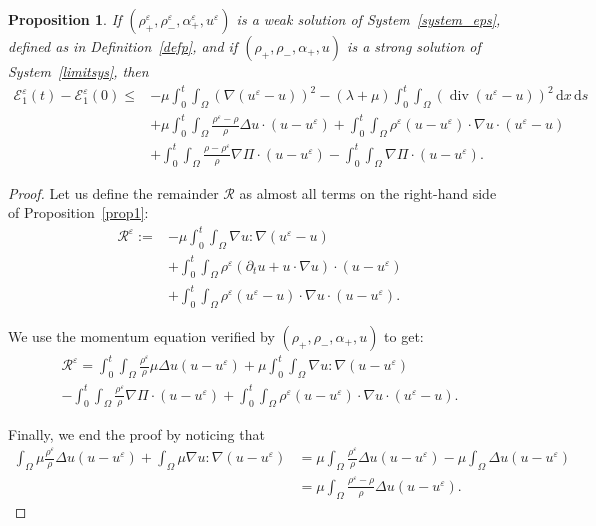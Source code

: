 \documentclass[11pt, twoside, a4paper]{article}
\theoremstyle{plain}
\newtheorem{proposition}[theorem]{Proposition}
\theoremstyle{remark}
\numberwithin{equation}{section}
\def\EE{{\mathcal E}}
\def\RR{{\mathcal R}}
\newcommand{\dd}{\,\mathrm{d}}
\renewcommand{\div}{\operatorname{div}}
\renewcommand{\leq}{\leqslant}\renewcommand{\le}{\leqslant}
\renewcommand{\epsilon}{\varepsilon}
\newcommand{\eps}{\varepsilon}
\begin{document}
\begin{proposition}\label{prop2}
If $(\rho^{\epsilon}_+,\rho^{\epsilon}_-,\alpha^{\epsilon}_+,u^{\epsilon})$ is a weak solution of System~\eqref{system_eps}, defined as in Definition~\ref{defp}, and if $(\rho_+,\rho_-,\alpha_+,u)$ is a strong solution of System~\eqref{limitsys}, then
\begin{align*}
\EE_1^\eps(t) - \EE_1^\eps(0) \leq& - \mu \int_0^t\!\!\! \int_{\Omega} \left( \nabla (u^{\epsilon}-u) \right)^2 - (\lambda+\mu) \int_0^t\!\!\! \int_{\Omega} \left( \div (u^{\epsilon}-u) \right)^2 \dd x \dd s \\
 &+ \mu \int_0^t\!\!\! \int_\Omega \frac{\rho^\eps - \rho}{\rho} \Delta u \cdot(u-u^\eps) 
 + \int_0^t\!\!\! \int_{\Omega} \rho^\eps (u-u^\eps) \cdot \nabla u \cdot (u^\eps-u) \\
 &+ \int_0^t\!\!\! \int_{\Omega} \frac{\rho-\rho^\eps}{\rho} \nabla \Pi\cdot (u-u^\eps)- \int_0^t\!\!\! \int_{\Omega} \nabla \Pi\cdot (u-u^\eps). 
\end{align*}
\end{proposition}

\begin{proof}
Let us define the remainder $\RR$ as almost all terms on the right-hand side of Proposition~\ref{prop1}:
 \begin{align*}
 \RR^\eps := &-\mu \int_0^t\!\!\! \int_{\Omega} \nabla u : \nabla(u^\eps-u) \\
 &+ \int_0^t\!\!\! \int_{\Omega} \rho^\eps (\partial_t u + u \cdot \nabla u)\cdot (u-u^{\epsilon}) \\
 &+ \int_0^t\!\!\! \int_{\Omega} \rho^\eps (u^{\epsilon}-u)\cdot \nabla u \cdot (u-u^{\epsilon}).
 \end{align*}

We use the momentum equation verified by $(\rho_+,\rho_-,\alpha_+,u)$ to get:
\begin{multline*}
 \RR^\eps = \int_0^t\!\!\! \int_{\Omega} \frac{\rho^\eps}{\rho} \mu \Delta u (u-u^{\epsilon}) +\mu \int_0^t\!\!\! \int_{\Omega} \nabla u : \nabla(u-u^{\epsilon})\\
 -\int_0^t\!\!\! \int_{\Omega} \frac{\rho^\eps}{\rho} \nabla \Pi \cdot (u-u^\eps) + \int_0^t\!\!\! \int_{\Omega} \rho^\eps (u-u^\eps) \cdot \nabla u \cdot (u^\eps-u).
\end{multline*}


Finally, we end the proof by noticing that 
\begin{align*}
 \int_{\Omega} \mu \frac{\rho^\eps}{\rho} \Delta u (u-u^{\epsilon}) + \int_{\Omega} \mu \nabla u : \nabla(u-u^\eps) &= \mu \int_\Omega \frac{\rho^\eps}{\rho}\Delta u (u-u^\eps)- \mu \int_\Omega \Delta u (u-u^\eps) \\
 &= \mu \int_\Omega \frac{\rho^\eps - \rho}{\rho} \Delta u (u-u^\eps).
\end{align*}

\end{proof}
\end{document}
